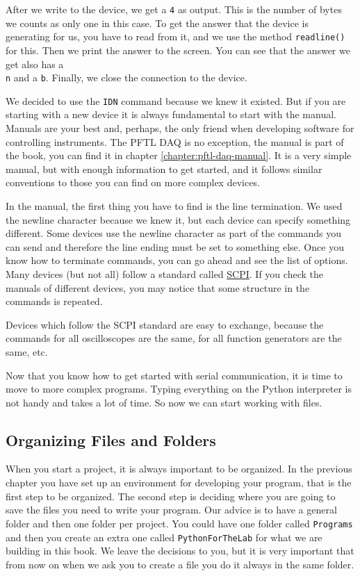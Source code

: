 After we write to the device, we get a \texttt{4} as output. This is the number of bytes we \texttt{\n} counts as only one in this case. To get the answer that the device is generating for us, you have to read from it, and we use the method \texttt{readline()} for this. Then we print the answer to the screen. You can see that the answer we get also has a \texttt{\\n} and a \texttt{b}. Finally, we close the connection to the device. 

We decided to use the \texttt{IDN} command because we knew it existed. But if you are starting with a new device it is always fundamental to start with the manual. Manuals are your best and, perhaps, the only friend when developing software for controlling instruments. The {PFTL DAQ} is no exception, the manual is part of the book, you can find it in chapter \ref{chapter:pftl-daq-manual}. It is a very simple manual, but with enough information to get started, and it follows similar conventions to those you can find on more complex devices. 

In the manual, the first thing you have to find is the line termination. We used the newline character because we knew it, but each device can specify something different. Some devices use the newline character as part of the commands you can send and therefore the line ending must be set to something else. Once you know how to terminate commands, you can go ahead and see the list of options. Many devices (but not all) follow a standard called \href{https://en.wikipedia.org/wiki/Standard_Commands_for_Programmable_Instruments}{SCPI}. If you check the manuals of different devices, you may notice that some structure in the commands is repeated. 

Devices which follow the SCPI standard are easy to exchange, because the commands for all oscilloscopes are the same, for all function generators are the same, etc. 

Now that you know how to get started with serial communication, it is time to move to more complex programs. Typing everything on the Python interpreter is not handy and takes a lot of time. So now we can start working with files. 

\subsection{Organizing Files and Folders}
When you start a project, it is always important to be organized. In the previous chapter you have set up an environment for developing your program, that is the first step to be organized. The second step is deciding where you are going to save the files you need to write your program. Our advice is to have a general folder and then one folder per project. You could have one folder called \texttt{Programs} and then you create an extra one called \texttt{PythonForTheLab} for what we are building in this book. We leave the decisions to you, but it is very important that from now on when we ask you to create a file you do it always in the same folder. 

